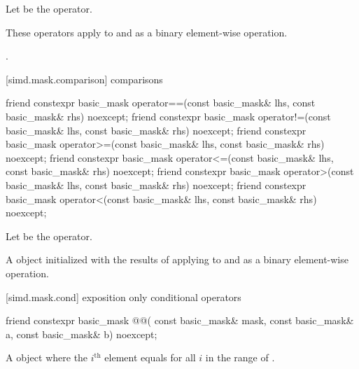 \begin{itemdescr}
\pnum
Let  be the operator.

\pnum
\effects
These operators apply  to  and  as a
binary element-wise operation.

\pnum
\returns
{}.
\end{itemdescr}

[simd.mask.comparison]{ comparisons}

\begin{itemdecl}
friend constexpr basic_mask
  operator==(const basic_mask& lhs, const basic_mask& rhs) noexcept;
friend constexpr basic_mask
  operator!=(const basic_mask& lhs, const basic_mask& rhs) noexcept;
friend constexpr basic_mask
  operator>=(const basic_mask& lhs, const basic_mask& rhs) noexcept;
friend constexpr basic_mask
  operator<=(const basic_mask& lhs, const basic_mask& rhs) noexcept;
friend constexpr basic_mask
  operator>(const basic_mask& lhs, const basic_mask& rhs) noexcept;
friend constexpr basic_mask
  operator<(const basic_mask& lhs, const basic_mask& rhs) noexcept;
\end{itemdecl}

\begin{itemdescr}
\pnum
Let  be the operator.

\pnum
\returns
A  object initialized with the results of applying
 to  and  as a binary element-wise
operation.
\end{itemdescr}

[simd.mask.cond]{ exposition only conditional operators}

\begin{itemdecl}
friend constexpr basic_mask @@(
  const basic_mask& mask, const basic_mask& a, const basic_mask& b) noexcept;
\end{itemdecl}

\begin{itemdescr}
\pnum
\returns
A  object where the $i^\text{th}$ element equals
 for all $i$ in the range of
.
\end{itemdescr}

